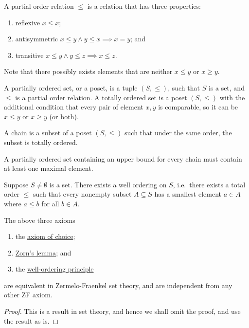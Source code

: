 \begin{definition}
    A partial order relation \(\leq\) is a relation that has three properties:
    \begin{enumerate}[label={(\roman*)}, itemsep=0mm]
        \item reflexive \(x \leq x\);
        \item antisymmetric \(x \leq y \land y \leq x \implies x = y\); and
        \item transitive \(x \leq y \land y \leq z \implies x \leq z\).
    \end{enumerate}
    Note that there possibly exists elements
    that are neither \(x \leq y\) or \(x \geq y\).
\end{definition}
\begin{definition}
    A partially ordered set, or a poset,
    is a tuple \((S,\leq)\),
    such that \(S\) is a set,
    and \(\leq\) is a partial order relation.
    A totally ordered set is a poset \((S,\leq)\)
    with the additional condition that every pair of element \(x,y\) is comparable,
    so it can be \(x \leq y\) or \(x \geq y\) (or both).
\end{definition}
\begin{definition}
    A chain is a subset of a poset \((S,\leq)\)
    such that under the same order, the subset is totally ordered.
\end{definition}
\begin{axiom}\label{ax:zorn}
    A partially ordered set containing an upper bound for every chain
    must contain at least one maximal element.
\end{axiom}

\begin{axiom}\label{ax:well-order}
    Suppose \(S \neq \emptyset\) is a set.
    There exists a well ordering on \(S\),
    i.e.\ there exists a total order \(\leq\)
    such that every nonempty subset \(A \subseteq S\)
    has a smallest element \(a \in A\) where \(a \leq b\) for all \(b \in A\).
\end{axiom}

\begin{theorem}
    The above three axioms
    \begin{enumerate}[label={(\alph*)}, itemsep=0mm]
        \item the \hyperref[ax:choice]{axiom of choice};
        \item \hyperref[ax:zorn]{Zorn's lemma}; and
        \item the \hyperref[ax:well-order]{well-ordering principle}
    \end{enumerate}
    are equivalent in Zermelo-Fraenkel set theory,
    and are independent from any other ZF axiom.
\end{theorem}
\begin{proof}
    This is a result in set theory, and hence we shall omit the proof,
    and use the result as is.
\end{proof}


